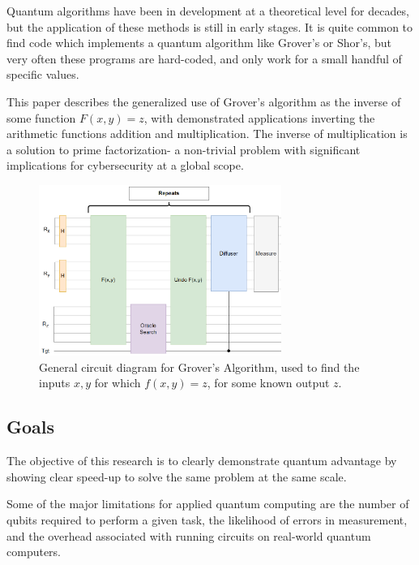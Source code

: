 \documentclass[twocolumn]{cinc}
\begin{document}
Quantum algorithms have been in development at a theoretical level for
decades, but the application of these methods is still in early stages.
It is quite common to find code which implements a quantum algorithm like
Grover's\cite{grover} or Shor's\cite{shor}, but very often these 
programs are hard-coded, and only
work for a small handful of specific values\cite{shors_ibm}.

This paper describes the generalized use of Grover's algorithm as the
inverse of some function $F(x, y) = z$, with demonstrated applications
inverting the arithmetic functions addition and multiplication. The 
inverse of multiplication is a solution to prime factorization- a 
non-trivial problem with significant implications for cybersecurity
at a global scope.

\begin{figure}[ht]\label{fig:FIGURA1}
\centering
\includegraphics[width=7.9cm]{grover_inversion.png}
\caption{General circuit diagram for Grover's Algorithm, used to find 
the inputs $x, y$ for which $f(x,y)=z$, for some known output $z$.}
\end{figure}

  \subsection{Goals}

  The objective of this research is to clearly demonstrate quantum advantage 
  by showing clear speed-up to solve the same problem at the same scale.

  Some of the major limitations for applied quantum computing are 
  the number of qubits required to perform a given task, the likelihood of errors
  in measurement, and the overhead associated with running circuits on real-world
  quantum computers. 
  
\end{document}
